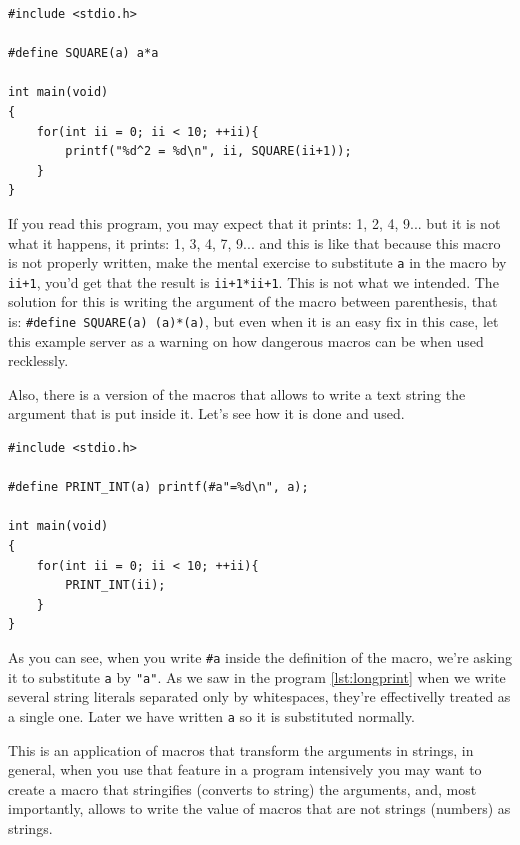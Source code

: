 \documentclass[a4paper]{article}
\begin{document}
\noindent
\begin{minipage}[H]{\linewidth}
\mbox{}
\begin{lstlisting}[style=C,
caption={Example of error because of a macro},
label={lst:macroError}]
#include <stdio.h>

#define SQUARE(a) a*a

int main(void)
{
    for(int ii = 0; ii < 10; ++ii){
        printf("%d^2 = %d\n", ii, SQUARE(ii+1));
    }
}
\end{lstlisting}
\end{minipage}

If you read this program, you may expect that it prints: 1, 2, 4, 9... but
it is not what it happens, it prints: 1, 3, 4, 7, 9... and this is like that
because this macro is not properly written, make the mental exercise to
substitute \verb!a! in the macro by \verb!ii+1!, you'd get that the result is
\verb!ii+1*ii+1!. This is not what we intended. The solution for this is writing
the argument of the macro between parenthesis, that is:
\verb!#define SQUARE(a) (a)*(a)!, but even when it is an easy fix in this case,
let this example server as a warning on how dangerous macros can be when used
recklessly.

Also, there is a version of the macros that allows to write a text string the
argument that is put inside it. Let's see how it is done and used.

\noindent
\begin{minipage}[H]{\linewidth}
\mbox{}
\begin{lstlisting}[style=C,
caption={Use of macros with strings},
label={lst:macroText}]
#include <stdio.h>

#define PRINT_INT(a) printf(#a"=%d\n", a);

int main(void)
{
    for(int ii = 0; ii < 10; ++ii){
        PRINT_INT(ii);
    }
}
\end{lstlisting}
\end{minipage}

As you can see, when you write \verb!#a! inside the definition of the macro,
we're asking it to substitute \verb!a! by \verb!"a"!. As we saw in the program
\ref{lst:longprint} when we write several string literals separated only by
whitespaces, they're effectivelly treated as a single one. Later we have written
\verb!a! so it is substituted normally.

This is an application of macros that transform the arguments in strings, in
general, when you use that feature in a program intensively you may want to
create a macro that stringifies (converts to string) the arguments, and, most
importantly, allows to write the value of macros that are not strings (numbers)
as strings.
\end{document}
